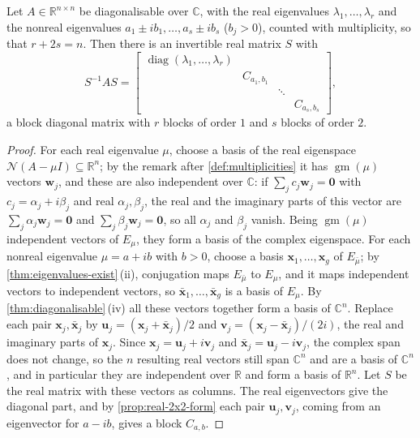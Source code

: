 \begin{theorem}
\label{thm:real-block-diagonal}
Let $A\in\mathbb R^{n\times n}$ be diagonalisable over $\mathbb C$, with the real eigenvalues $\lambda_1,\ldots,\lambda_r$ and the nonreal eigenvalues $a_1\pm ib_1,\ldots,a_s\pm ib_s$ ($b_j>0$), counted with multiplicity, so that $r+2s=n$. Then there is an invertible real matrix $S$ with
\[
S^{-1}AS=\begin{bmatrix}\operatorname{diag}(\lambda_1,\ldots,\lambda_r)&&&\\&C_{a_1,b_1}&&\\&&\ddots&\\&&&C_{a_s,b_s}\end{bmatrix},
\]
a block diagonal matrix with $r$ blocks of order $1$ and $s$ blocks of order $2$.
\end{theorem}

\begin{proof}
For each real eigenvalue $\mu$, choose a basis of the real eigenspace $\mathcal N(A-\mu I)\subseteq\mathbb R^n$; by the remark after \cref{def:multiplicities} it has $\operatorname{gm}(\mu)$ vectors $\mathbf w_j$, and these are also independent over $\mathbb C$: if $\sum_jc_j\mathbf w_j=\mathbf 0$ with $c_j=\alpha_j+i\beta_j$ and real $\alpha_j,\beta_j$, the real and the imaginary parts of this vector are $\sum_j\alpha_j\mathbf w_j=\mathbf 0$ and $\sum_j\beta_j\mathbf w_j=\mathbf 0$, so all $\alpha_j$ and $\beta_j$ vanish. Being $\operatorname{gm}(\mu)$ independent vectors of $E_\mu$, they form a basis of the complex eigenspace. For each nonreal eigenvalue $\mu=a+ib$ with $b>0$, choose a basis $\mathbf x_1,\ldots,\mathbf x_g$ of $E_{\bar\mu}$; by \cref{thm:eigenvalues-exist}\,(ii), conjugation maps $E_{\bar\mu}$ to $E_\mu$, and it maps independent vectors to independent vectors, so $\bar{\mathbf x}_1,\ldots,\bar{\mathbf x}_g$ is a basis of $E_\mu$. By \cref{thm:diagonalisable}\,(iv) all these vectors together form a basis of $\mathbb C^n$. Replace each pair $\mathbf x_j,\bar{\mathbf x}_j$ by $\mathbf u_j=(\mathbf x_j+\bar{\mathbf x}_j)/2$ and $\mathbf v_j=(\mathbf x_j-\bar{\mathbf x}_j)/(2i)$, the real and imaginary parts of $\mathbf x_j$. Since $\mathbf x_j=\mathbf u_j+i\mathbf v_j$ and $\bar{\mathbf x}_j=\mathbf u_j-i\mathbf v_j$, the complex span does not change, so the $n$ resulting real vectors still span $\mathbb C^n$ and are a basis of $\mathbb C^n$, and in particular they are independent over $\mathbb R$ and form a basis of $\mathbb R^n$. Let $S$ be the real matrix with these vectors as columns. The real eigenvectors give the diagonal part, and by \cref{prop:real-2x2-form} each pair $\mathbf u_j,\mathbf v_j$, coming from an eigenvector for $a-ib$, gives a block $C_{a,b}$.
\end{proof}

